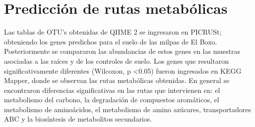 \documentclass[12pt,letterpaper,oneside]{report}
\begin{document}
\section{Predicción de rutas metabólicas}
Las tablas de OTU’s obtenidas de QIIME 2 se ingresaron en PICRUSt; obteniendo los genes predichos para el suelo de las milpas de El Boxo. Posteriormente se compararon las abundancias de estos genes en las muestras asociadas a las raíces y de los controles de suelo. Los genes que resultaron significativamente diferentes (Wilcoxon, p \textless  0.05) fueron ingresados en KEGG Mapper, donde se observan las rutas metabólicas obtenidas. En general se encontraron diferencias significativas en las rutas que intervienen en: el metabolismo del carbono, la degradación de compuestos aromáticos, el metabolismo de aminoácidos, el metabolismo de amino azúcares, transportadores ABC y la biosíntesis de metabolitos secundarios. 
\end{document}
